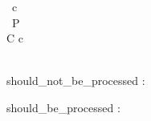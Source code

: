 \documentclass{article}
\begin{document}
\begin{circus}
   \circchannel\ c \\
    \circprocess\ P \circdef \circbegin \\
       C \circdef c \then \Skip \\
       \znewpage
    \circspot \Skip \\
    \zbreak
    \circend
\end{circus}

\circtoolsoff

\begin{circus}
   \circchannel should\_not\_be\_processed : \nat
\end{circus}

\circtoolson

\begin{circus}
   \circchannel should\_be\_processed : \nat
\end{circus}
\end{document}
